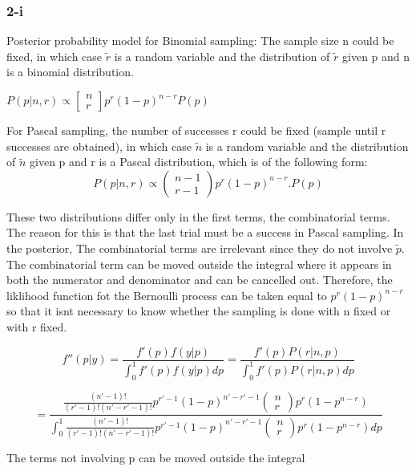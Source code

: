 \documentclass[]{article}
\begin{document}
\subsubsection{2-i}\label{i}

Posterior probability model for Binomial sampling: The sample size n
could be fixed, in which case \(\tilde r\) is a random variable and the
distribution of \(\tilde r\) given p and n is a binomial distribution.

\(P(p| n, r) \propto \left[\begin{array}{cc} n \\r \end{array}\right] p^r(1-p)^{n-r} P(p)\)

For Pascal sampling, the number of successes r could be fixed (sample
until r successes are obtained), in which case \(\tilde n\) is a random
variable and the distribution of \(\tilde n\) given p and r is a Pascal
distribution, which is of the following form: \[
P(p| n, r) \propto \left(\begin{array}{cc} 
n-1 \\
r-1
\end{array}\right)
p^r(1-p)^{n-r}.P(p)
\]

These two distributions differ only in the first terms, the
combinatorial terms. The reason for this is that the last trial must be
a success in Pascal sampling. In the posterior, The combinatorial terms
are irrelevant since they do not involve \(\tilde p\). The combinatorial
term can be moved outside the integral where it appears in both the
numerator and denominator and can be cancelled out. Therefore, the
liklihood function fot the Bernoulli process can be taken equal to
\(p^r(1-p)^{n-r}\) so that it isnt necessary to know whether the
sampling is done with n fixed or with r fixed.

\[f''(p|y) = \frac{f'(p)f(y|p)}{\int_{0}^{1}f'(p)f(y|p)dp} = \frac{f'(p)P(r|n,p)}{\int_{0}^{1}f'(p)P(r|n,p)dp} \]

\[= \frac{\frac{(n'-1)!}{(r'-1)!(n'-r'-1)!}p^{r'-1}(1-p)^{n'-r'-1}\left(\begin{array}{cc} 
n \\
r 
\end{array}\right)p^r(1-p^{n-r})}
{\int_{0}^{1}\frac{(n'-1)!}{(r'-1)!(n'-r'-1)!}p^{r'-1}(1-p)^{n'-r'-1}\left(\begin{array}{cc} 
n \\
r 
\end{array}\right)p^r(1-p^{n-r})dp}\]

The terms not involving p can be moved outside the integral
\end{document}
